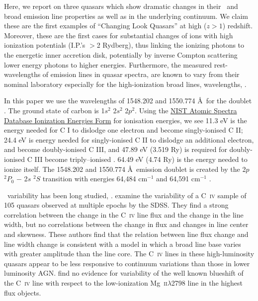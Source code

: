 \documentclass[a4paper,fleqn,usenatbib]{mnras}
\begin{document}
Here, we report on three quasars  
which show dramatic changes in their \civ\ and \ciii broad emission
line properties as well as in the underlying continuum. We claim these
are the first examples of ``Changing Look Quasars'' at high ($z>1$)
redshift. Moreover, these are the first cases for substantial changes
of ions with high ionization potentials (I.P.'s $>$2 Rydberg), thus
linking the ionizing photons to the energetic inner accretion disk,
potentially by inverse Compton scattering lower energy photons to
higher energies.  Furthermore, the measured rest-wavelengths of
emission lines in quasar spectra, are known to vary from their nominal
laboratory especially for the high-ionization broad lines,
wavelengths, \citep[e.g.][]{VandenBerk2001}.

In this paper we use the wavelengths of 1548.202 and 1550.774 \AA\ for
the \civ doublet \citep{Kramida2018}. The ground state of carbon is
1$s^2$ 2$s^2$ 2$p^2$.  Using the
\href{https://physics.nist.gov/PhysRefData/ASD/ionEnergy.html}{NIST
Atomic Spectra Database Ionization Energies Form} for ionisation
energies, we see 11.3 eV is the energy needed for C I to dislodge one
electron and become singly-ionised C II; 24.4 eV is energy needed for
singly-ionised C II to dislodge an additional electron, and become
doubly-ionised C III, and 47.89 eV (3.519 Ry) is required for
doubly-ionised C III become triply--ionised \civ.  64.49 eV (4.74 Ry)
is the energy needed to ionize \civ itself. The 1548.202 and 1550.774
\AA\ emission doublet is created by the 2$p$ $^{2}P_{0}$ $-$ 2$s$
$^{2}S$ transition with energies 64,484 cm$^{-1}$ and 64,591 cm$^{-1}$
\citep[e.g.][]{Moore1993}.
 
\civ\ variability has been long studied, \citep[e.g., ][]{Baldwin1977,
Gaskell1982, Gregory1982, Wilkes1986, Espey1989, Espey1990Erratum,
ZhengSulentic1990, Corbin1990, Corbin1991, Weymann1991,
Dimitrijevic1992, TytlerFan1992, Wills1993, Brotherton1994, Osmer1994,
Laor1995, McIntosh1999, Nazarova2003}.
\citet{Wilhite2006} examine the variability of a C~\textsc{iv} sample
of 105 quasars observed at multiple epochs by the SDSS.  They find a
strong correlation between the change in the C~\textsc{iv} line flux
and the change in the line width, but no correlations between the
change in flux and changes in line center and skewness.  These authors
find that the relation between line flux change and line width change
is consistent with a model in which a broad line base varies with
greater amplitude than the line core. The C~\textsc{iv} lines in these
high-luminosity quasars appear to be less responsive to continuum
variations than those in lower luminosity AGN.  \citet{Wilhite2006}
find no evidence for variability of the well known blueshift of the
C~\textsc{iv} line with respect to the low-ionization
Mg~\textsc{ii}$\lambda$2798 line in the highest flux objects.
\end{document}
